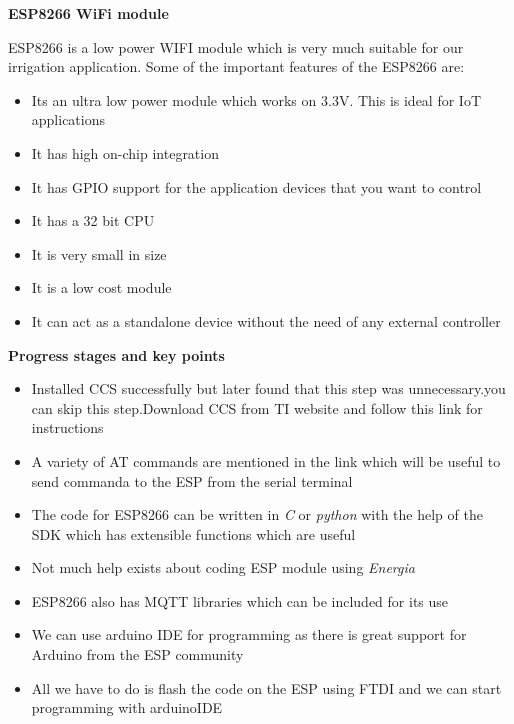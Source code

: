 \documentclass[16pt]{article}
\begin{document}
\vspace{5cm}
{\LARGE{\textbf{ESP8266 WiFi module}}}

\vspace{0.5cm}

ESP8266 is a low power WIFI module which is very much suitable for our
irrigation application. Some of the important features of the ESP8266
are:

\begin{itemize}

\item
  Its an ultra low power module which works on 3.3V. This is ideal for
  IoT applications
\item
  It has high on-chip integration
\item
  It has GPIO support for the application devices that you want to
  control
\item
  It has a 32 bit CPU
\item
  It is very small in size
\item
  It is a low cost module
\item
  It can act as a standalone device without the need of any external
  controller
\end{itemize}

{\Large{\textbf{Progress stages and key points}}}

\begin{itemize}

\item
  Installed CCS successfully but later found that this step was unnecessary.you can skip this step.Download CCS from TI website and follow this link for instructions
\item
  A variety of AT commands are mentioned in the link which will be
  useful to send commanda to the ESP from the serial terminal
\item
  The code for ESP8266 can be written in \emph{C} or \emph{python} with
  the help of the SDK which has extensible functions which are useful
\item
  Not much help exists about coding ESP module using \emph{Energia}
\item
  ESP8266 also has MQTT libraries which can be included for its use
\item
  We can use arduino IDE for programming as there is great support for
  Arduino from the ESP community
\item
  All we have to do is flash the code on the ESP using FTDI and we can
  start programming with arduinoIDE
  
\end{itemize}
\end{document}
